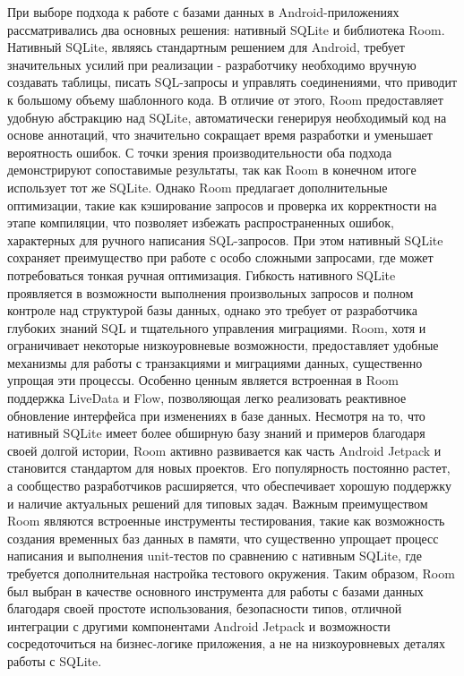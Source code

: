 \documentclass{vsureport}
\begin{document}
При выборе подхода к работе с базами данных в Android-приложениях рассматривались два основных решения: нативный SQLite и библиотека Room. Нативный SQLite, являясь стандартным решением для Android, требует значительных усилий при реализации - разработчику необходимо вручную создавать таблицы, писать SQL-запросы и управлять соединениями, что приводит к большому объему шаблонного кода. В отличие от этого, Room предоставляет удобную абстракцию над SQLite, автоматически генерируя необходимый код на основе аннотаций, что значительно сокращает время разработки и уменьшает вероятность ошибок.
С точки зрения производительности оба подхода демонстрируют сопоставимые результаты, так как Room в конечном итоге использует тот же SQLite. Однако Room предлагает дополнительные оптимизации, такие как кэширование запросов и проверка их корректности на этапе компиляции, что позволяет избежать распространенных ошибок, характерных для ручного написания SQL-запросов. При этом нативный SQLite сохраняет преимущество при работе с особо сложными запросами, где может потребоваться тонкая ручная оптимизация.
Гибкость нативного SQLite проявляется в возможности выполнения произвольных запросов и полном контроле над структурой базы данных, однако это требует от разработчика глубоких знаний SQL и тщательного управления миграциями. Room, хотя и ограничивает некоторые низкоуровневые возможности, предоставляет удобные механизмы для работы с транзакциями и миграциями данных, существенно упрощая эти процессы. Особенно ценным является встроенная в Room поддержка LiveData и Flow, позволяющая легко реализовать реактивное обновление интерфейса при изменениях в базе данных.
Несмотря на то, что нативный SQLite имеет более обширную базу знаний и примеров благодаря своей долгой истории, Room активно развивается как часть Android Jetpack и становится стандартом для новых проектов. Его популярность постоянно растет, а сообщество разработчиков расширяется, что обеспечивает хорошую поддержку и наличие актуальных решений для типовых задач.
Важным преимуществом Room являются встроенные инструменты тестирования, такие как возможность создания временных баз данных в памяти, что существенно упрощает процесс написания и выполнения unit-тестов по сравнению с нативным SQLite, где требуется дополнительная настройка тестового окружения.
Таким образом, Room был выбран в качестве основного инструмента для работы с базами данных благодаря своей простоте использования, безопасности типов, отличной интеграции с другими компонентами Android Jetpack и возможности сосредоточиться на бизнес-логике приложения, а не на низкоуровневых деталях работы с SQLite. \cite{ref3}
\end{document}
